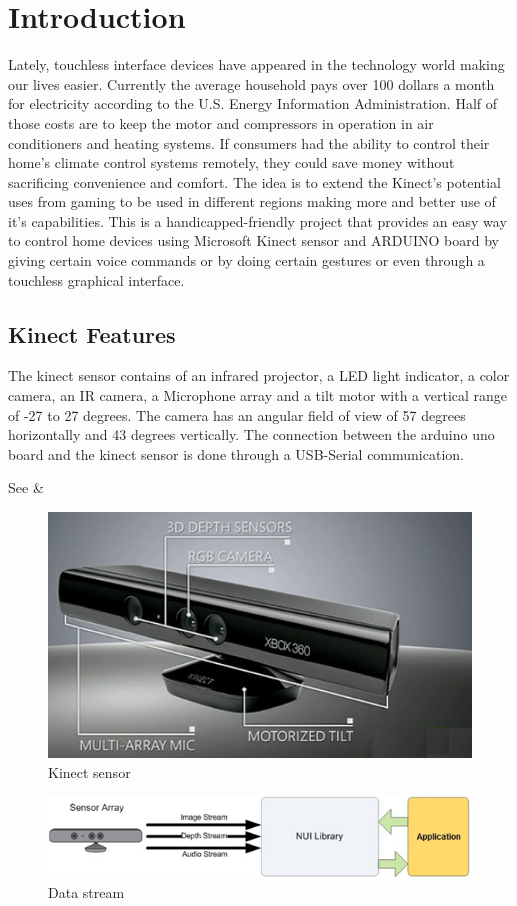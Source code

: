 \chapter{Introduction}

Lately, touchless interface devices have appeared in the technology world making our lives easier. Currently the average household pays over 100 dollars a month for electricity according to the U.S. Energy Information Administration. Half of those costs are to keep the motor and compressors in operation in air conditioners and heating systems. If consumers had the ability to control their home’s climate control systems remotely, they could save money without sacrificing convenience and comfort.
The idea is to extend the Kinect's potential uses from gaming to be used in different regions making more and better use of it's capabilities. This is a handicapped-friendly project that provides an easy way to control home devices using Microsoft Kinect sensor and ARDUINO board by giving certain voice commands or by doing certain gestures or even through a touchless graphical interface.


\section{Kinect Features}

The kinect sensor contains of an infrared projector, a LED light indicator, a color camera, an IR camera, a Microphone array and a tilt motor with a vertical range of -27 to 27 degrees.
The camera has an angular field of view of 57 degrees horizontally and 43 degrees vertically.
The connection between the arduino uno board and the kinect sensor is done through a USB-Serial communication.

See  & 


\begin{figure}[tbp]
  \centering
  \includegraphics[width=.5\linewidth]{KinectSensor}
  \caption{Kinect sensor}
  \label{fig:kinectsensor}
\end{figure}
  
\begin{figure}[tbp]
  \centering
  \includegraphics[width=1.0\linewidth]{KinectDataStream}
  \caption{Data stream}
  \label{fig:datastream}
\end{figure}
  

